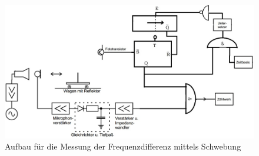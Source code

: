 \begin{figure}[h]
  \centering
  \includegraphics[width=1\textwidth]{Grafiken/V104_Abb4.jpg}
  \caption{Aufbau für die Messung der Frequenzdifferenz mittels Schwebung}
  \label{fig:V104_Abb4}
\end{figure}

